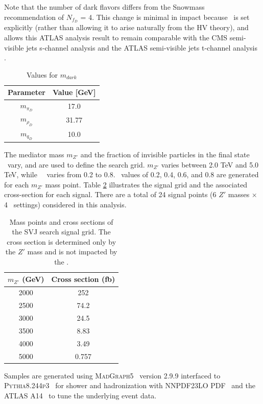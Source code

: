 Note that the number of dark flavors differs from the Snowmass~\cite{snowmass} recommendation of $N_{f_D}$ = 4. 
This change is minimal in impact because \rinv~is set explicitly (rather than allowing it to arise naturally from the HV theory), and allows this ATLAS analysis result to remain comparable with the CMS semi-visible jets s-channel analysis \cite{cms_svj} and the ATLAS semi-visible jets t-channel analysis \cite{tchannel}. \par

\begin{table}
\centering
  \begin{tabular}{ |c|c| }
    \hline
    Parameter & Value [GeV] \\
    \hline
     $m_{\pi_D}$ & 17.0 \\
     $m_{\rho_D}$ & 31.77 \\ 
     $m_{q_D}$ & 10.0 \\ 
    \hline
  \end{tabular}
  \caption{Values for $m_{dark}$}
  \label{tab:model_mdark}
\end{table}

The mediator mass $m_{Z'}$ and the fraction of invisible particles in the final state \rinv~vary, and are used to define the search grid. $m_{Z'}$ varies between 2.0 TeV and 5.0 TeV, while~\rinv~ varies from 0.2 to 0.8. \rinv~values of 0.2, 0.4, 0.6, and 0.8 are generated for each $m_{Z'}$ mass point. Table \ref{tab:sig_grid} illustrates the signal grid and the associated cross-section for each signal. There are a total of 24 signal points (6 $Z'$ masses $\times$ 4 \rinv~settings) considered in this analysis.

\begin{table}
\centering
  \begin{tabular}{ |c|c| }
    \hline
    $m_{Z'}$ (GeV) & Cross section (fb)  \\
    \hline
     2000 &  252 \\
     2500 &  74.2 \\
     3000 &  24.5\\ 
     3500 &  8.83\\
     4000 &  3.49 \\ 
     5000 &  0.757 \\
    \hline
  \end{tabular}
  \caption{Mass points and cross sections of the SVJ search signal grid. The cross section is determined only by the $Z'$ mass and is not impacted by the \rinv. }
  \label{tab:sig_grid}
\end{table}

Samples are generated using 
\textsc{MadGraph5}~\cite{Alwall:2014hca} version 2.9.9 interfaced to 
\textsc{Pythia8.244p3}~\cite{pythia} for shower and hadronization with 
NNPDF23LO PDF~\cite{Butterworth:2015oua} and the 
ATLAS A14~\cite{Skands:2014pea} to tune the underlying event data.
